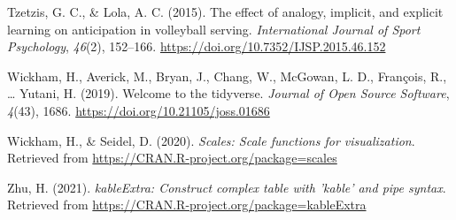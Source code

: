 \documentclass[
  english,
  man, donotrepeattitle,floatsintext]{apa7}
\newlength{\cslhangindent}
\newlength{\cslentryspacingunit} %
\newenvironment{CSLReferences}[2] %
 {%
  \setlength{\parindent}{0pt}
  \ifodd #1
  \let\oldpar\par
  \def\par{\hangindent=\cslhangindent\oldpar}
  \fi
  \setlength{\parskip}{#2\cslentryspacingunit}
 }%
 {}
\begin{document}
\begin{CSLReferences}{1}{0}
\leavevmode{}%
Tzetzis, G. C., \& Lola, A. C. (2015). The effect of analogy, implicit, and explicit learning on anticipation in volleyball serving. \emph{International Journal of Sport Psychology}, \emph{46}(2), 152--166. \url{https://doi.org/10.7352/IJSP.2015.46.152}

\leavevmode{}%
Wickham, H., Averick, M., Bryan, J., Chang, W., McGowan, L. D., François, R., \ldots{} Yutani, H. (2019). Welcome to the {tidyverse}. \emph{Journal of Open Source Software}, \emph{4}(43), 1686. \url{https://doi.org/10.21105/joss.01686}

\leavevmode{}%
Wickham, H., \& Seidel, D. (2020). \emph{Scales: Scale functions for visualization}. Retrieved from \url{https://CRAN.R-project.org/package=scales}

\leavevmode{}%
Zhu, H. (2021). \emph{kableExtra: Construct complex table with 'kable' and pipe syntax}. Retrieved from \url{https://CRAN.R-project.org/package=kableExtra}

\end{CSLReferences}
\end{document}

